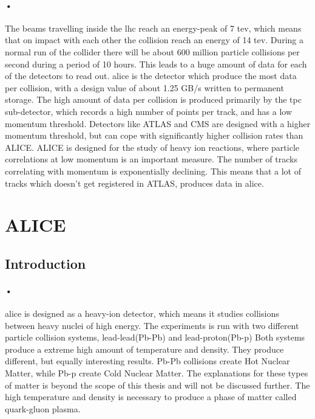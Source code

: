 \documentclass[a4paper, 12pt]{report}
\begin{document}
\paragraph{•}
The beams travelling inside the \gls{lhc} reach an energy-peak of 7 \gls{tev}, which means that on impact with each other the collision reach an energy of 14 \gls{tev}\cite{lhc-pdf}.
During a normal run of the collider there will be about 600 million particle collisions per second during a period of 10 hours.
This leads to a huge amount of data for each of the detectors to read out.
\gls{alice} is the detector which produce the most data per collision, with a design value of about 1.25 GB/s written to permanent storage.
The high amount of data per collision is produced primarily by the \gls{tpc} sub-detector, which records a high number of points per track, and has a low momentum threshold. Detectors like ATLAS and CMS  are designed with a higher momentum threshold, but can cope with significantly higher collision rates than ALICE.
ALICE is designed for the study of heavy ion reactions, where particle correlations at low momentum is an important measure.
The number of tracks correlating with momentum is exponentially declining.
This means that a lot of tracks which doesn't get registered in ATLAS, produces data in \gls{alice}.

\section{ALICE}
\subsection{Introduction}

\paragraph{•}
\gls{alice} is designed as a heavy-ion detector, which means it studies collisions between heavy nuclei of high energy\cite{alice-home}.
The experiments is run with two different particle collision systems, lead-lead(Pb-Pb) and lead-proton(Pb-p)
Both systems produce a extreme high amount of temperature and density.
They produce different, but equally interesting results.
Pb-Pb collisions create Hot Nuclear Matter, while Pb-p create Cold Nuclear Matter.
The explanations for these types of matter is beyond the scope of this thesis and will not be discussed further.
The high temperature and density is necessary to produce a phase of matter called quark-gluon plasma.
\end{document}

